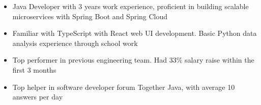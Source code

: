 \begin{itemize}
    \item Java Developer with 3 years work experience, proficient in building scalable microservices with Spring Boot and Spring Cloud
    \item Familiar with TypeScript with React web UI development. Basic Python data analysis experience through school work
    \item Top performer in previous engineering team. Had 33\% salary raise within the first 3 months
    \item Top helper in software developer forum Together Java, with average 10 answers per day
\end{itemize}